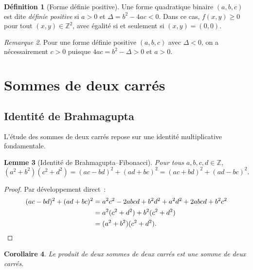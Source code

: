 \documentclass[12pt,a4paper,openany]{book}
\theoremstyle{definition}
\newtheorem{definition}{Définition}[chapter]
\theoremstyle{plain}
\newtheorem{lemme}[definition]{Lemme}
\newtheorem{corollaire}[definition]{Corollaire}
\theoremstyle{remark}
\newtheorem{remarque}[definition]{Remarque}
\newcommand{\Z}{\mathbb{Z}}
\begin{document}
\begin{definition}[Forme définie positive]
\label{def:forme-definie-positive}
Une forme quadratique binaire $(a,b,c)$ est dite \emph{définie positive} si $a > 0$ et
$\Delta = b^2 - 4ac < 0$. Dans ce cas, $f(x,y) \geq 0$ pour tout $(x,y) \in \Z^2$, avec
égalité si et seulement si $(x,y) = (0,0)$.
\end{definition}

\begin{remarque}
\label{rem:discriminant-negatif}
Pour une forme définie positive $(a,b,c)$ avec $\Delta < 0$, on a nécessairement $c > 0$
puisque $4ac = b^2 - \Delta > 0$ et $a > 0$.
\end{remarque}

\section{Sommes de deux carrés}
\label{sec:sommes-deux-carres}

\subsection{Identité de Brahmagupta}

L'étude des sommes de deux carrés repose sur une identité multiplicative fondamentale.

\begin{lemme}[Identité de Brahmagupta--Fibonacci]
\label{lem:brahmagupta}
Pour tous $a, b, c, d \in \Z$,
\[
  (a^2 + b^2)(c^2 + d^2) = (ac - bd)^2 + (ad + bc)^2
    = (ac + bd)^2 + (ad - bc)^2.
\]
\end{lemme}

\begin{proof}
Par développement direct~:
\begin{align*}
  (ac - bd)^2 + (ad + bc)^2
    &= a^2c^2 - 2abcd + b^2d^2 + a^2d^2 + 2abcd + b^2c^2 \\
    &= a^2(c^2 + d^2) + b^2(c^2 + d^2) \\
    &= (a^2 + b^2)(c^2 + d^2). \qedhere
\end{align*}
\end{proof}

\begin{corollaire}
\label{cor:produit-sommes-carres}
Le produit de deux sommes de deux carrés est une somme de deux carrés.
\end{corollaire}
\end{document}
